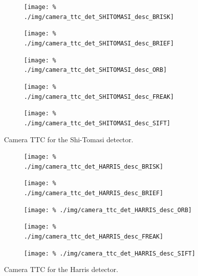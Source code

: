 \documentclass[a4paper]{scrartcl}
\begin{document}
\begin{figure}
	\centering
	\begin{subfigure}[c]{0.45\columnwidth}
		\texttt{[image: \%
			./img/camera\_ttc\_det\_SHITOMASI\_desc\_BRISK]}
	\end{subfigure}
	\begin{subfigure}[c]{0.45\columnwidth}
		\texttt{[image: \%
			./img/camera\_ttc\_det\_SHITOMASI\_desc\_BRIEF]}
	\end{subfigure}
	\begin{subfigure}[c]{0.45\columnwidth}
		\texttt{[image: \%
			./img/camera\_ttc\_det\_SHITOMASI\_desc\_ORB]}
	\end{subfigure}
	\begin{subfigure}[c]{0.45\columnwidth}
		\texttt{[image: \%
			./img/camera\_ttc\_det\_SHITOMASI\_desc\_FREAK]}
	\end{subfigure}
	\begin{subfigure}[c]{0.45\columnwidth}
		\texttt{[image: \%
			./img/camera\_ttc\_det\_SHITOMASI\_desc\_SIFT]}
	\end{subfigure}
	\caption{Camera TTC for the Shi-Tomasi detector.}
	\label{fig:camera:ttc:detector_SHITOMASI}
\end{figure}

\begin{figure}
	\centering
	\begin{subfigure}[c]{0.45\columnwidth}
		\texttt{[image: \%
			./img/camera\_ttc\_det\_HARRIS\_desc\_BRISK]}
	\end{subfigure}
	\begin{subfigure}[c]{0.45\columnwidth}
		\texttt{[image: \%
			./img/camera\_ttc\_det\_HARRIS\_desc\_BRIEF]}
	\end{subfigure}
	\begin{subfigure}[c]{0.45\columnwidth}
		\texttt{[image: \%
			./img/camera\_ttc\_det\_HARRIS\_desc\_ORB]}
	\end{subfigure}
	\begin{subfigure}[c]{0.45\columnwidth}
		\texttt{[image: \%
			./img/camera\_ttc\_det\_HARRIS\_desc\_FREAK]}
	\end{subfigure}
	\begin{subfigure}[c]{0.45\columnwidth}
		\texttt{[image: \%
			./img/camera\_ttc\_det\_HARRIS\_desc\_SIFT]}
	\end{subfigure}
	\caption{Camera TTC for the Harris detector.}
	\label{fig:camera:ttc:detector_HARRIS}
\end{figure}
\end{document}
